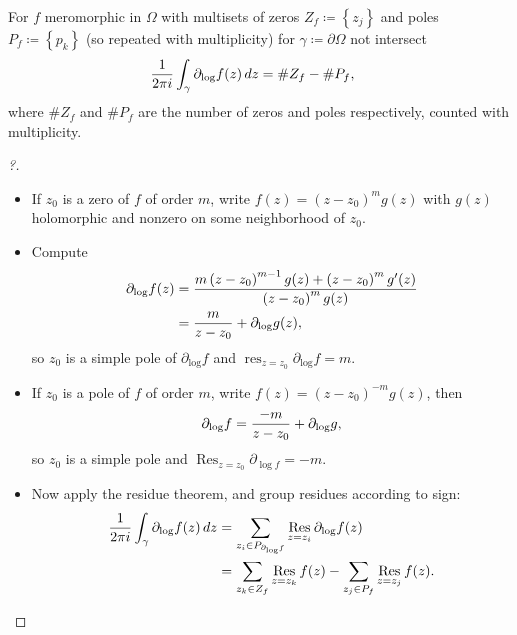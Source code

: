 \begin{theorem}

For \(f\) meromorphic in \(\Omega\) with multisets of zeros
\(Z_f \coloneqq\left\{{ z_j }\right\}\) and poles
\(P_f\coloneqq\left\{{ p_k }\right\}\) (so repeated with multiplicity)
for \(\gamma \coloneqq{{\partial}}\Omega\) not intersect
\begin{align*}  
{1\over 2\pi i} \int_\gamma {\partial}_{\log} f(z) \,dz
&= \# Z_f - \# P_f
,\end{align*}
where \(\# Z_f\) and \(\# P_f\) are the number of zeros and poles
respectively, counted with multiplicity.

\end{theorem}

\begin{proof}[?]

\envlist

\begin{itemize}
\item
  If \(z_0\) is a zero of \(f\) of order \(m\), write
  \(f(z) = (z-z_0)^m g(z)\) with \(g(z)\) holomorphic and nonzero on
  some neighborhood of \(z_0\).
\item
  Compute
  \begin{align*}
  {\partial}_{\log} f(z)
  &=
  \frac{m\left(z-z_{0}\right)^{m-1} g(z)+\left(z-z_{0}\right)^{m} g^{\prime}(z)}{\left(z-z_{0}\right)^{m} g(z)} \\
  &= {m \over z-z_0} + {\partial}_{\log} g(z)
  ,\end{align*}
  so \(z_0\) is a simple pole of \({\partial}_{\log} f\) and
  \(\mathop{\mathrm{res}}_{z=z_0} {\partial}_{\log} f = m\).
\item
  If \(z_0\) is a pole of \(f\) of order \(m\), write
  \(f(z) = (z-z_0)^{-m} g(z)\), then
  \begin{align*}
  {\partial}_{\log} f = {-m \over z-z_0} + {\partial}_{\log} g
  ,\end{align*}
  so \(z_0\) is a simple pole and
  \(\mathop{\mathrm{Res}}_{z=z_0} {\partial}_{\log f} = -m\).
\item
  Now apply the residue theorem, and group residues according to sign:
  \begin{align*}
  {1\over 2\pi i } \int_{\gamma} {\partial}_{\log }f(z) \,dz
  &= \sum_{z_i \in P_{{\partial}_{\log} f}} \mathop{\mathrm{Res}}_{z=z_i} {\partial}_{\log} f(z)\\
  &= \sum_{z_k \in Z_f} \mathop{\mathrm{Res}}_{z=z_k} f(z) - \sum_{z_j \in P_f} \mathop{\mathrm{Res}}_{z=z_j} f(z)
  .\end{align*}
\end{itemize}

\end{proof}

